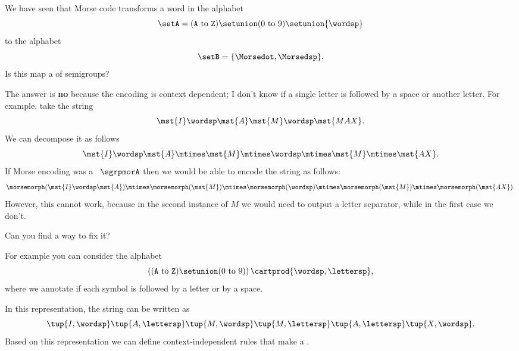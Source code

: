 \begin{exercise}
    We have seen that Morse code transforms a word in the alphabet
    \begin{equation*}
        \label{eq:morse-alphabet-ext}
        \setA = (\texttt{A} \ \text{to}\ \texttt{Z}) \setunion (0 \ \text{to}\ 9) \setunion \{\wordsp\}
    \end{equation*}
    to the alphabet
    \begin{equation*}
        \setB = \{\Morsedot, \Morsedsp\}.
    \end{equation*}
    Is this map a \whomo of semigroups?
\end{exercise}
%
\begin{solution}
    The answer is \textbf{no} because the encoding is context dependent; I don't know if a single letter is followed by a space or another letter.
    For example, take the string
    \begin{equation}
        \label{eq:max-iammax}
        \mst {I} \wordsp \mst{A} \mst{M}\wordsp \mst{MAX}.
    \end{equation}
    We can decompose it as follows
    \begin{equation}
        \label{eq:max-iammax-decomp}
        \mst{I}\wordsp \mst{A}\mtimes \mst{M} \mtimes \wordsp \mtimes \mst{M} \mtimes \mst{AX}.
    \end{equation}
    If Morse encoding was a \whomo~$\sgrpmorA$ then we would be able to encode the string as follows:
    \begin{equation}
        \label{eq:max-iammax-decomp-morph}
        \morsemorph(\mst{I}\wordsp \mst{A}) \mtimes \morsemorph (\mst{M}) \mtimes  \morsemorph(\wordsp) \mtimes  \morsemorph(\mst{M})
        \mtimes  \morsemorph(\mst{AX}).
    \end{equation}
    However, this cannot work, because in the second instance of $M$ we would need to output a letter separator, while in the first case we don't.

    Can you find a way to fix it?

    For example you can consider the alphabet
    \begin{equation}
        \left( (\texttt{A} \ \text{to}\ \texttt{Z}) \setunion (0 \ \text{to}\ 9) \right) \cartprod \{\wordsp, \lettersp\},
    \end{equation}
    where we annotate if each symbol is followed by a letter or by a space.

    In this representation, the string can be written as
    \begin{equation}
        \tup{I, \wordsp} \tup{A, \lettersp} \tup{ M, \wordsp} \tup{M, \lettersp} \tup{A, \lettersp}
        \tup{X, \wordsp}.
    \end{equation}
    Based on this representation we can define context-independent rules that make a \whomo.
\end{solution}

